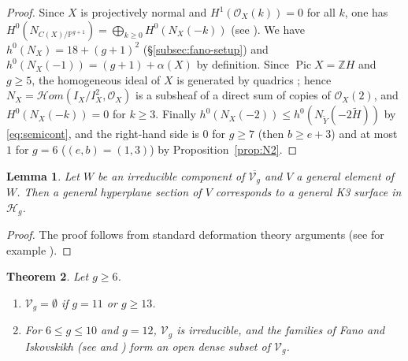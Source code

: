 \documentclass[11pt,reqno]{amsart}
\theoremstyle{plain}
\newtheorem{theorem}{Theorem}[section]
\newtheorem{lemma}[theorem]{Lemma}
\theoremstyle{definition}
\newcommand{\PP}{\mathbb{P}}
\newcommand{\OO}{\mathcal{O}}
\newcommand{\sHom}{\mathcal{H}om}
\newcommand{\Yt}{\widetilde{Y}}
\newcommand{\Ht}{\widetilde{H}}
\newcommand{\NYt}{N_{\Yt}}
\begin{document}
\begin{proof}
Since $X$ is projectively normal and $H^1(\OO_X(k))=0$ for all $k$, one has $H^0(N_{C(X)/\PP^{g+1}})=\bigoplus_{k\ge0}H^0(N_X(-k))$ (see \cite[\S2]{CLM93}). We have $h^0(N_X)=18+(g+1)^2$ (\S\ref{subsec:fano-setup}) and $h^0(N_X(-1))=(g+1)+\alpha(X)$ by definition. Since $\operatorname{Pic}X=\mathbb ZH$ and $g\ge5$, the homogeneous ideal of $X$ is generated by quadrics \cite{SD74}; hence $N_X=\sHom(I_X/I_X^2,\OO_X)$ is a subsheaf of a direct sum of copies of $\OO_X(2)$, and $H^0(N_X(-k))=0$ for $k\ge3$. Finally $h^0(N_X(-2))\le h^0(\NYt(-2\Ht))$ by \eqref{eq:semicont}, and the right-hand side is $0$ for $g\ge7$ (then $b\ge e+3$) and at most $1$ for $g=6$ ($(e,b)=(1,3)$) by Proposition~\ref{prop:N2}.
\end{proof}

\begin{lemma}\label{lem:hypsection}
Let $W$ be an irreducible component of $\overline{\mathcal V_g}$ and $V$ a general element of $W$. Then a general hyperplane section of $V$ corresponds to a general K3 surface in $\mathcal H_g$.
\end{lemma}

\begin{proof}
The proof follows from standard deformation theory arguments (see for example \cite[Lemma~3.7]{CLM98}).
\end{proof}

\begin{theorem}\label{thm:fano}
Let $g\ge6$.
\begin{enumerate}
\item $\mathcal V_g=\emptyset$ if $g=11$ or $g\ge13$.
\item For $6\le g\le10$ and $g=12$, $\mathcal V_g$ is irreducible, and the families of Fano and Iskovskikh \cite{Isk77,Isk78} (see \cite{Muk88} and \cite[Table~3.1]{CLM98}) form an open dense subset of $\mathcal V_g$.
\end{enumerate}
\end{theorem}
\end{document}
